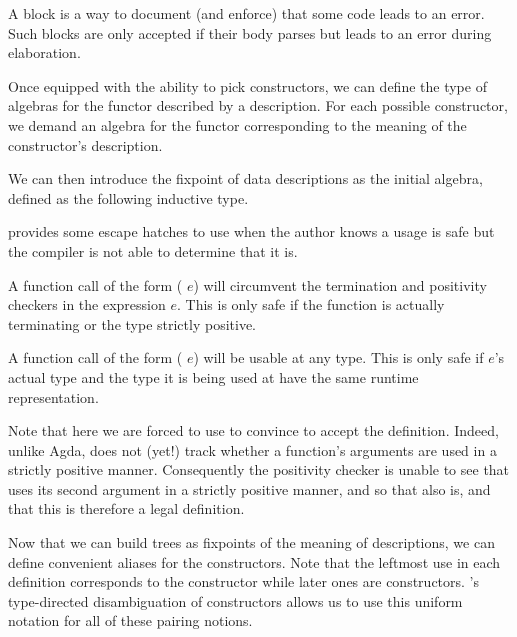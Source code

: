 \begin{remark}
  A  block is a way to document (and
  enforce) that some code leads to an error.
  Such blocks are only accepted if their body parses but
  leads to an error during elaboration.
\end{remark}

Once equipped with the ability to pick constructors, we can define
the type of algebras for the functor described by a 
description. For each possible constructor, we demand an algebra for
the functor corresponding to the meaning of the  constructor's description.


We can then introduce the fixpoint of data descriptions as the initial
algebra, defined as the following inductive type.


\begin{remark}
  \idris{} provides some escape hatches to use when the author
  knows a usage is safe but the compiler is not able to
  determine that it is.

  A function call of the form (\assertTotal{} $e$) will
  circumvent the termination and positivity checkers in
  the expression $e$.
  This is only safe if the function is actually terminating
  or the type strictly positive.

  A function call of the form (\believeMe{} $e$) will be
  usable at any type. This is only safe if $e$'s actual type
  and the type it is being used at have the same runtime
  representation.
\end{remark}

Note that here we are forced to use \assertTotal{} to convince \idris{}
to accept the definition.
%
Indeed, unlike Agda, \idris{} does not (yet!) track whether a function's
arguments are used in a strictly positive manner.
%
Consequently the positivity checker
is unable to see that  uses its second
argument in a strictly positive manner,
and so that  also is,
and that this is therefore a legal definition.

Now that we can build trees as fixpoints of the
meaning of descriptions, we can define convenient aliases for
the  constructors.
%
Note that the leftmost \IdrisData{(\#)} use in each definition corresponds
to the  constructor while later ones are 
constructors.
%
\idris{}'s type-directed disambiguation of constructors allows us to use
this uniform notation for all of these pairing notions.

